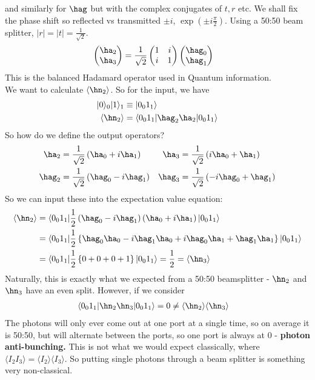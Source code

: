 \documentclass[a4paper, 11pt, normalem]{report}
\begin{document}
and similarly for $\hag$ but with the complex conjugates of $t,r$ etc.
We shall fix the phase shift so reflected vs transmitted $\pm i$, $\exp\left(\pm i\frac{\pi}{2}\right)$.
Using a 50:50 beam splitter, $|r|=|t|=\frac{1}{\sqrt{2}}$.
\begin{align}
    \begin{pmatrix}\ha_2 \\ \ha_3\end{pmatrix} &= \frac{1}{\sqrt{2}}\begin{pmatrix} 1 & i \\ i & 1\end{pmatrix}\begin{pmatrix} \hag_0 \\ \hag_1\end{pmatrix}
\end{align}
This is the balanced Hadamard operator used in Quantum information.\\
We want to calculate $\langle\hn_2\rangle$.
So for the input, we have 
\begin{align}
    |0\rangle_0|1\rangle_1 &\equiv |0_01_1\rangle \\
    \langle\hn_2\rangle &= \langle 0_01_1|\hag_2\ha_2|0_01_1\rangle
\end{align}
So how do we define the output operators?
\begin{align}
    \ha_2 &= \frac{1}{\sqrt{2}}\left(\ha_0+i\ha_1\right) & \ha_3 &= \frac{1}{\sqrt{2}}\left(i\ha_0+\ha_1\right) \\
    \hag_2 &= \frac{1}{\sqrt{2}}\left(\hag_0-i\hag_1\right) & \hag_3 &= \frac{1}{\sqrt{2}}\left(-i\hag_0+\hag_1\right)
\end{align}
So we can input these into the expectation value equation:
\begin{align}
    \langle\hn_2\rangle &= \langle0_01_1|\frac12\left(\hag_0-i\hag_1\right)\left(\ha_0+i\ha_1\right)|0_01_1\rangle \\
                        &= \langle0_01_1|\frac12\left\{\hag_0\ha_0 - i\hag_1\ha_0+i\hag_0\ha_1+\hag_1\ha_1\right\}|0_01_1\rangle\\
                        &= \langle0_01_1|\frac12\left\{0 + 0 + 0 + 1\right\}|0_01_1\rangle = \frac12 = \langle\hn_3\rangle
\end{align}
Naturally, this is exactly what we expected from a 50:50 beamsplitter - $\hn_2$ and $\hn_3$ have an even split.
However, if we consider
\begin{align}
    \langle0_01_1|\hn_2\hn_3|0_01_1\rangle &= 0 \neq \langle\hn_2\rangle\langle\hn_3\rangle
\end{align}
The photons will only ever come out at one port at a single time, so on average it is 50:50, but will alternate between the ports, so one port is always at 0 - \textbf{photon anti-bunching.}
This is not what we would expect classically, where $\langle I_2I_3\rangle = \langle I_2\rangle\langle I_3\rangle$.
So putting single photons through a beam splitter is something very non-classical.
\end{document}
